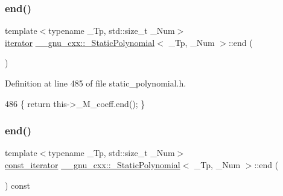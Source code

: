 \subsubsection{\texorpdfstring{end()}{end()}\hspace{0.1cm}{\footnotesize\ttfamily [1/2]}}
{\footnotesize\ttfamily template$<$typename \+\_\+\+Tp, std\+::size\+\_\+t \+\_\+\+Num$>$ \\
\hyperlink{class____gnu__cxx_1_1__StaticPolynomial_ac52661d1503c79a7c5c90426cd0ac41e}{iterator} \hyperlink{class____gnu__cxx_1_1__StaticPolynomial}{\+\_\+\+\_\+gnu\+\_\+cxx\+::\+\_\+\+Static\+Polynomial}$<$ \+\_\+\+Tp, \+\_\+\+Num $>$\+::end (\begin{DoxyParamCaption}{ }\end{DoxyParamCaption})\hspace{0.3cm}{\ttfamily [inline]}}



Definition at line 485 of file static\+\_\+polynomial.\+h.


\begin{DoxyCode}
486       \{ \textcolor{keywordflow}{return} this->\_M\_coeff.end(); \}
\end{DoxyCode}
\mbox{\label{class____gnu__cxx_1_1__StaticPolynomial_af163a1465847135b8f90125b8cde728d}} 
\subsubsection{\texorpdfstring{end()}{end()}\hspace{0.1cm}{\footnotesize\ttfamily [2/2]}}
{\footnotesize\ttfamily template$<$typename \+\_\+\+Tp, std\+::size\+\_\+t \+\_\+\+Num$>$ \\
\hyperlink{class____gnu__cxx_1_1__StaticPolynomial_a6fac29559236e7576f7e35b03d35ee08}{const\+\_\+iterator} \hyperlink{class____gnu__cxx_1_1__StaticPolynomial}{\+\_\+\+\_\+gnu\+\_\+cxx\+::\+\_\+\+Static\+Polynomial}$<$ \+\_\+\+Tp, \+\_\+\+Num $>$\+::end (\begin{DoxyParamCaption}{ }\end{DoxyParamCaption}) const\hspace{0.3cm}{\ttfamily [inline]}}



